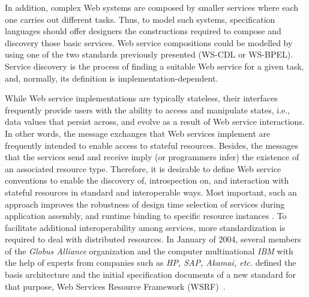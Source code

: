 In addition, complex Web systems are composed by smaller services where each one carries out different tasks. Thus, to model such systems, specification languages should offer designers the constructions required to compose and discovery those basic services. Web service compositions could be modelled by using one of the two standards previously presented (WS-CDL or WS-BPEL). Service discovery is the process of finding a suitable Web service for a given task, and, normally, its definition is implementation-dependent. %

While Web service implementations are typically stateless, 
their interfaces frequently provide users with the ability
to access and manipulate states, i.e., data values that persist
across, and evolve as a result of Web service interactions. In
other words, the message exchanges that Web services implement
are frequently intended to enable access to stateful
resources. Besides, the messages that the services send
and receive imply (or programmers infer) the existence of
an associated resource type. Therefore, it is desirable to define Web
service conventions to enable the discovery of, introspection on, 
and interaction with stateful resources in standard
and interoperable ways. Most important, such an approach
improves the robustness of design time selection of services
during application assembly, and runtime binding to specific
resource instances \cite{Czajkowski2004}.
To facilitate additional interoperability among services, more standardization is required to deal with distributed resources. In January of 2004, several members of the \emph{Globus Alliance} organization and the computer multinational \emph{IBM} with the help of experts from companies such as \emph{HP, SAP, Akamai, etc.} defined the basis architecture and the initial specification documents of a new standard for that purpose, Web Services Resource Framework (WSRF)~\cite{Foster2004}.

